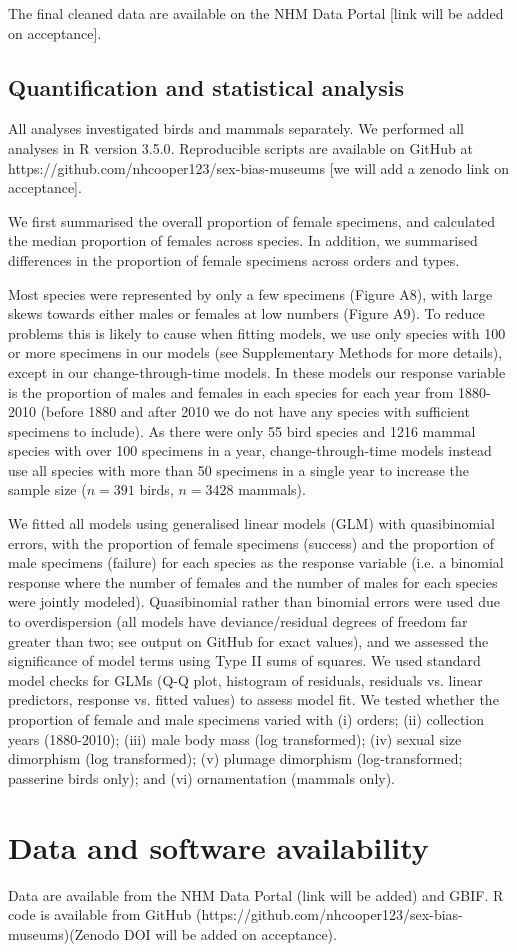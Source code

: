 \documentclass[a4paper, 12pt]{article}
\begin{document}
The final cleaned data are available on the NHM Data Portal [link will be added on acceptance]. 

\subsection{Quantification and statistical analysis}
All analyses investigated birds and mammals separately. 
We performed all analyses in R version 3.5.0\cite{R}. 
Reproducible scripts are available on GitHub at https://github.com/nhcooper123/sex-bias-museums [we will add a zenodo link on acceptance].

We first summarised the overall proportion of female specimens, and calculated the median proportion of females across species. 
In addition, we summarised differences in the proportion of female specimens across orders and types. 

Most species were represented by only a few specimens (Figure A8), with large skews towards either males or females at low numbers (Figure A9). 
To reduce problems this is likely to cause when fitting models, we use only species with 100 or more specimens in our models (see Supplementary Methods for more details), except in our change-through-time models. 
In these models our response variable is the proportion of males and females in each species for each year from 1880-2010 (before 1880 and after 2010 we do not have any species with sufficient specimens to include). 
As there were only 55 bird species and 1216 mammal species with over 100 specimens in a year, change-through-time models instead use all species with more than 50 specimens in a single year to increase the sample size ($n = 391$ birds, $n = 3428$ mammals).

We fitted all models using generalised linear models (GLM) with quasibinomial errors, with the proportion of female specimens (success) and the proportion of male specimens (failure) for each species as the response variable (i.e. a binomial response where the number of females and the number of males for each species were jointly modeled). 
Quasibinomial rather than binomial errors were used due to overdispersion (all models have deviance/residual degrees of freedom far greater than two; see output on GitHub for exact values), and we assessed the significance of model terms using Type II sums of squares. 
We used standard model checks for GLMs (Q-Q plot, histogram of residuals, residuals vs. linear predictors, response vs. fitted values) to assess model fit. 
We tested whether the proportion of female and male specimens varied with (i) orders; (ii) collection years (1880-2010); (iii) male body mass (log transformed); (iv) sexual size dimorphism (log transformed); (v) plumage dimorphism (log-transformed; passerine birds only); and (vi) ornamentation (mammals only). 

\section{Data and software availability}\label{data-code-and-materials}
Data are available from the NHM Data Portal (link will be added) and GBIF. 
R code is available from GitHub (https://github.com/nhcooper123/sex-bias-museums)(Zenodo DOI will be added on acceptance).
\end{document}
